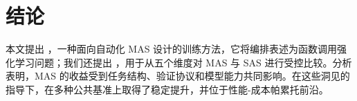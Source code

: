 \section{结论}

本文提出 \ourframework，一种面向自动化 MAS 设计的训练方法，它将编排表述为函数调用强化学习问题；我们还提出 \ourbenchmark，用于从五个维度对 MAS 与 SAS 进行受控比较。分析表明，MAS 的收益受到任务结构、验证协议和模型能力共同影响。在这些洞见的指导下，\ourframework 在多种公共基准上取得了稳定提升，并位于性能-成本帕累托前沿。




